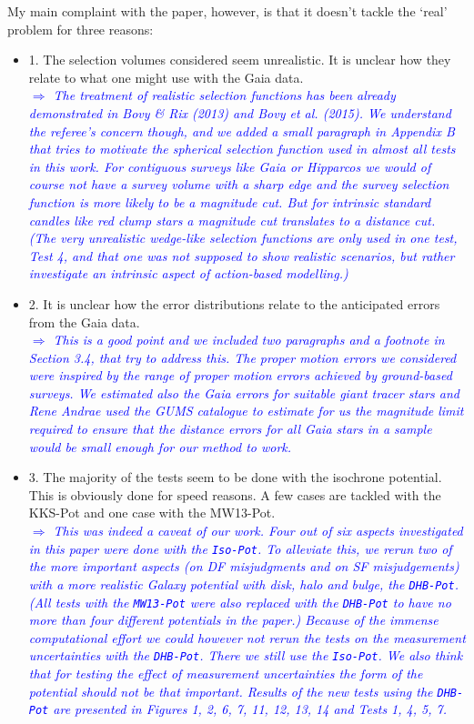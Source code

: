 \documentclass[10pt,a4paper]{article}
\newcommand{\Comment}[1]{\textsl{\textcolor{Blue}{$\Longrightarrow$ {#1}}}}
\begin{document}
My main complaint with the paper, however, is that it doesn't tackle the `real'
problem for three reasons:
\begin{itemize}
\item 1. The selection volumes considered seem unrealistic. It is unclear how they relate to what one might use with the Gaia data. \\\Comment{The treatment of realistic selection functions has been already demonstrated in Bovy \& Rix (2013) and Bovy et al. (2015). We understand the referee's concern though, and we added a small paragraph in Appendix B that tries to motivate the spherical selection function used in almost all tests in this work. For contiguous surveys like Gaia or Hipparcos we would of course not have a survey volume with a sharp edge and the survey selection function is more likely to be a magnitude cut. But for intrinsic standard candles like red clump stars a magnitude cut translates to a distance cut. (The very unrealistic wedge-like selection functions are only used in one test, Test 4, and that one was not supposed to show realistic scenarios, but rather investigate an intrinsic aspect of action-based modelling.)}\\
\item 2. It is unclear how the error distributions relate to the anticipated errors from the Gaia data. \\\Comment{This is a good point and we included two paragraphs and a footnote in Section 3.4, that try to address this. The proper motion errors we considered were inspired by the range of proper motion errors achieved by ground-based surveys. We estimated also the Gaia errors for suitable giant tracer stars and Rene Andrae used the GUMS catalogue to estimate for us the magnitude limit required to ensure that the distance errors for all Gaia stars in a sample would be small enough for our method to work.}
\item 3. The majority of the tests seem to be done with the isochrone potential. This is obviously done for speed reasons. A few cases are tackled with the KKS-Pot and one case with the MW13-Pot. \\\Comment{This was indeed a caveat of our work. Four out of six aspects investigated in this paper were done with the \texttt{Iso-Pot}. To alleviate this, we rerun two of the more important aspects (on DF misjudgments and on SF misjudgements) with a more realistic Galaxy potential with disk, halo and bulge, the \texttt{DHB-Pot}. (All tests with the \texttt{MW13-Pot} were also replaced with the \texttt{DHB-Pot} to have no more than four different potentials in the paper.) Because of the immense computational effort we could however not rerun the tests on the measurement uncertainties with the \texttt{DHB-Pot}. There we still use the \texttt{Iso-Pot}. We also think that for testing the effect of measurement uncertainties the form of the potential should not be that important. Results of the new tests using the \texttt{DHB-Pot} are presented in Figures 1, 2, 6, 7, 11, 12, 13, 14 and Tests 1, 4, 5, 7.} \\

\end{itemize}
\end{document}
